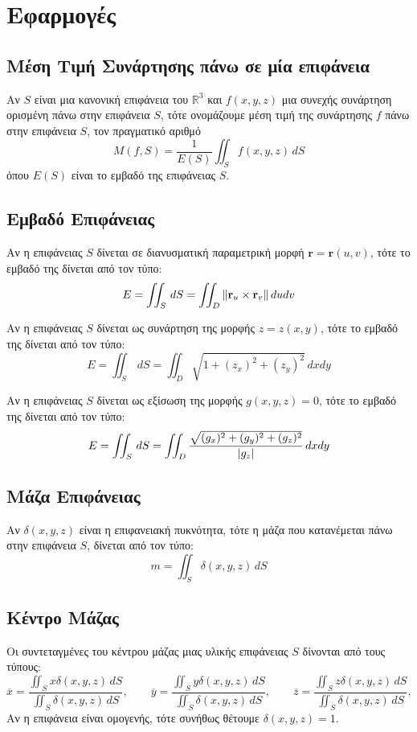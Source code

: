 \section{Εφαρμογές}

\subsection*{Μέση Τιμή Συνάρτησης πάνω σε μία επιφάνεια}

Αν $S$ είναι μια κανονική επιφάνεια του $ \mathbb{R}^{3} $ και $ f(x,y,z) $ μια 
συνεχής συνάρτηση ορισμένη πάνω στην επιφάνεια $S$, τότε ονομάζουμε μέση τιμή της 
συνάρτησης $f$ πάνω στην επιφάνεια $S$, τον πραγματικό αριθμό
\[
  M(f,S) = \frac{1}{E(S)} \iint_{S} f(x,y,z) \,{dS} 
\] 
όπου $ E(S) $ είναι το εμβαδό της επιφάνειας $S$.

\subsection*{Εμβαδό Επιφάνειας}

Αν η επιφάνειας $S$ δίνεται σε διανυσματική παραμετρική μορφή 
$ \mathbf{r} = \mathbf{r}(u,v) $, τότε το εμβαδό της δίνεται από τον τύπο:
\[
  E = \iint_{S} \,{dS} = \iint_{D} \norm{\mathbf{r}_{u} \times \mathbf{r}_{v}} \,{du}
  {dv} 
 \]

 Αν η επιφάνειας $S$ δίνεται ως συνάρτηση της μορφής $ z=z(x,y) $, τότε το εμβαδό της 
 δίνεται από τον τύπο:
\[
  E = \iint_{S} \,{dS} = \iint_{D} \sqrt{1 + (z_{x})^{2}+(z_{y})^{2}} \,{dx} {dy} 
 \]

 Αν η επιφάνειας $S$ δίνεται ως εξίσωση της μορφής $ g(x,y,z) = 0 $, τότε το εμβαδό της 
 δίνεται από τον τύπο:
\[
  E = \iint_{S} \,{dS} = \iint_{D} \frac{\sqrt{(g_{x})^{2} + (g_{y})^{2}+(g_{z})^{2}}}
  {\abs{g_{z}}} \,{dx} {dy} 
 \]

\subsection*{Μάζα Επιφάνειας}

Αν $ \delta (x,y,z) $ είναι η επιφανειακή πυκνότητα, τότε η μάζα που κατανέμεται πάνω 
στην επιφάνεια $S$, δίνεται από τον τύπο:
\[
  m = \iint_{S} \delta (x,y,z) \,{dS}  
 \] 

\subsection*{Κέντρο Μάζας}

Οι συντεταγμένες του κέντρου μάζας μιας υλικής επιφάνειας $S$ δίνονται από τους 
τύπους: 
\[
  \overline{x} = \frac{\iint_{S} x \delta (x,y,z) \,{dS}}{\iint_{S} \delta (x,y,z) \,{dS}
  }, \qquad 
  \overline{y} = \frac{\iint_{S} y \delta (x,y,z) \,{dS}}{\iint_{S} \delta (x,y,z) \,{dS}
  }, \qquad
  \overline{z} = \frac{\iint_{S} z \delta (x,y,z) \,{dS}}{\iint_{S} \delta (x,y,z) \,{dS}
}, \qquad
\]
Αν η επιφάνεια είναι ομογενής, τότε συνήθως θέτουμε $ \delta (x,y,z)=1 $.

